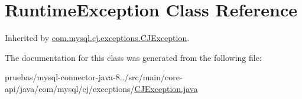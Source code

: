 \hypertarget{class_runtime_exception}{}\section{Runtime\+Exception Class Reference}
\label{class_runtime_exception}


Inherited by \mbox{\hyperlink{classcom_1_1mysql_1_1cj_1_1exceptions_1_1_c_j_exception}{com.\+mysql.\+cj.\+exceptions.\+C\+J\+Exception}}.



The documentation for this class was generated from the following file\+:\begin{DoxyCompactItemize}
\item 
pruebas/mysql-\/connector-\/java-\/8../src/main/core-\/api/java/com/mysql/cj/exceptions/\mbox{\hyperlink{_c_j_exception_8java}{C\+J\+Exception.\+java}}\end{DoxyCompactItemize}
